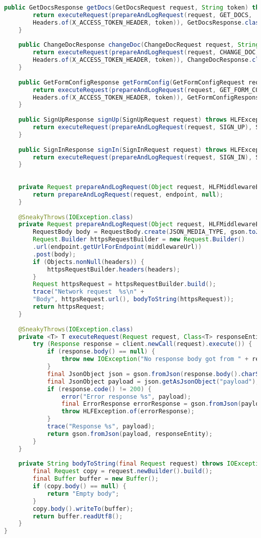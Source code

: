 \begin{lstlisting}[language=Java]
	public GetDocsResponse getDocs(GetDocsRequest request, String token) throws HLFException {
		return executeRequest(prepareAndLogRequest(request, GET_DOCS,
		Headers.of(X_ACCESS_TOKEN_HEADER, token)), GetDocsResponse.class);
	}
	
	public ChangeDocResponse changeDoc(ChangeDocRequest request, String token) throws HLFException {
		return executeRequest(prepareAndLogRequest(request, CHANGE_DOC,
		Headers.of(X_ACCESS_TOKEN_HEADER, token)), ChangeDocResponse.class);
	}
	
	public GetFormConfigResponse getFormConfig(GetFormConfigRequest request, String token) throws HLFException {
		return executeRequest(prepareAndLogRequest(request, GET_FORM_CONFIG,
		Headers.of(X_ACCESS_TOKEN_HEADER, token)), GetFormConfigResponse.class);
	}
	
	public SignUpResponse signUp(SignUpRequest request) throws HLFException {
		return executeRequest(prepareAndLogRequest(request, SIGN_UP), SignUpResponse.class);
	}
	
	public SignInResponse signIn(SignInRequest request) throws HLFException {
		return executeRequest(prepareAndLogRequest(request, SIGN_IN), SignInResponse.class);
	}
	
	
	private Request prepareAndLogRequest(Object request, HLFMiddlewareEndpoints endpoint) {
		return prepareAndLogRequest(request, endpoint, null);
	}
	
	@SneakyThrows(IOException.class)
	private Request prepareAndLogRequest(Object request, HLFMiddlewareEndpoints endpoint, Headers headers) {
		RequestBody body = RequestBody.create(JSON_MEDIA_TYPE, gson.toJson(request));
		Request.Builder httpsRequestBuilder = new Request.Builder()
		.url(endpoint.getUrlForEndpoint(middlewareUrl))
		.post(body);
		if (Objects.nonNull(headers)) {
			httpsRequestBuilder.headers(headers);
		}
		Request httpsRequest = httpsRequestBuilder.build();
		trace("Network request  %s\n" +
		"Body", httpsRequest.url(), bodyToString(httpsRequest));
		return httpsRequest;
	}
	
	@SneakyThrows(IOException.class)
	private <T> T executeRequest(Request request, Class<T> responseEntity) throws HLFException {
		try (Response response = client.newCall(request).execute()) {
			if (response.body() == null) {
				throw new IOException("No response body got from " + request.url());
			}
			final JsonObject json = gson.fromJson(response.body().charStream(), JsonObject.class);
			final JsonObject payload = json.getAsJsonObject("payload");
			if (response.code() != 200) {
				error("Error response %s", payload);
				final ErrorResponse errorResponse = gson.fromJson(payload, ErrorResponse.class);
				throw HLFException.of(errorResponse);
			}
			trace("Response %s", payload);
			return gson.fromJson(payload, responseEntity);
		}
	}
	
	private String bodyToString(final Request request) throws IOException {
		final Request copy = request.newBuilder().build();
		final Buffer buffer = new Buffer();
		if (copy.body() == null) {
			return "Empty body";
		}
		copy.body().writeTo(buffer);
		return buffer.readUtf8();
	}
}

\end{lstlisting}
